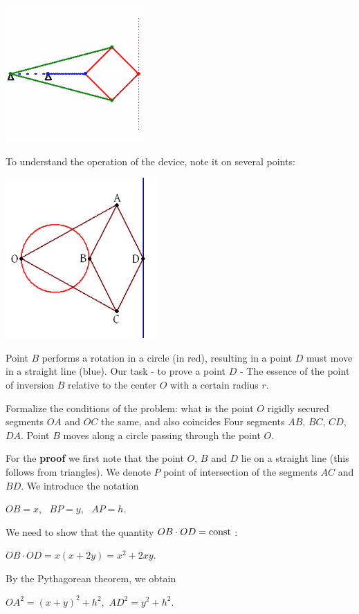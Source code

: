 \includegraphics[scale=0.5]{15.png}

To understand the operation of the device, note it on several points:

\includegraphics[scale=0.5]{16.png}

Point $B$ performs a rotation in a circle (in red), resulting in a point $D$ must move in a straight line (blue). Our task - to prove a point $D$ - The essence of the point of inversion $B$ relative to the center $O$ with a certain radius $r$.

Formalize the conditions of the problem: what is the point $O$ rigidly secured segments $OA$ and $OC$ the same, and also coincides Four segments $AB$, $BC$, $CD$, $DA$. Point $B$ moves along a circle passing through the point $O$.

For the \textbf{proof} we first note that the point $O$, $B$ and $D$ lie on a straight line (this follows from triangles). We denote $P$ point of intersection of the segments $AC$ and $BD$. We introduce the notation

$OB = x, ~ ~ ~ BP = y, ~ ~ ~ AP = h.$

We need to show that the quantity $OB \cdot OD = {\rm const}$ :

$OB \cdot OD = x (x +2 y) = x ^ 2 + 2xy.$

By the Pythagorean theorem, we obtain

$OA ^ 2 = (x + y) ^ 2 + h ^ 2,$
$AD ^ 2 = y ^ 2 + h ^ 2.$

